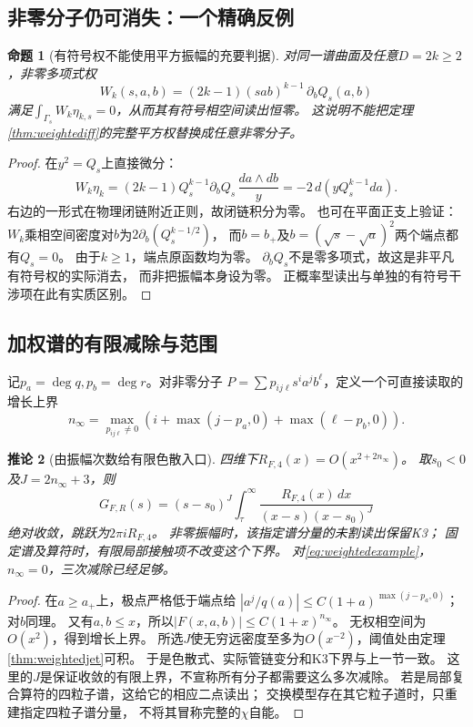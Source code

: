 \documentclass[11pt,a4paper]{ctexart}
\theoremstyle{cnplain}\newtheorem{theorem}{定理}[section]
\newtheorem{proposition}[theorem]{命题}
\newtheorem{corollary}[theorem]{推论}
\theoremstyle{definition}\newtheorem{definition}[theorem]{定义}
\theoremstyle{remark}\newtheorem{remark}[theorem]{注}
\begin{document}
\subsection{非零分子仍可消失：一个精确反例}
\begin{proposition}[有符号权不能使用平方振幅的充要判据]\label{prop:weightedsigned}
对同一谱曲面及任意$D=2k\ge2$，非零多项式权
\begin{equation}\label{eq:weightedsigned}
 W_k(s,a,b)=(2k-1)(sab)^{k-1}\,\partial_bQ_s(a,b)
\end{equation}
满足$\int_{\Gamma_s}W_k\eta_{k,s}=0$，从而其有符号相空间读出恒零。
这说明不能把定理\ref{thm:weightediff}的完整平方权替换成任意非零分子。
\end{proposition}
\begin{proof}
在$y^2=Q_s$上直接微分：
\[
 W_k\eta_k=(2k-1)Q_s^{k-1}\partial_bQ_s\,\frac{da\wedge db}{y}
              =-2\,d\!\left(yQ_s^{k-1}da\right).
\]
右边的一形式在物理闭链附近正则，故闭链积分为零。
也可在平面正支上验证：
$W_k$乘相空间密度对$b$为$2\partial_b(Q_s^{k-1/2})$，
而$b=b_+$及$b=(\sqrt s-\sqrt a)^2$两个端点都有$Q_s=0$。
由于$k\ge1$，端点原函数均为零。
$\partial_bQ_s$不是零多项式，故这是非平凡有符号权的实际消去，
而非把振幅本身设为零。
正概率型读出与单独的有符号干涉项在此有实质区别。
\end{proof}

\subsection{加权谱的有限减除与范围}
记$p_a=\deg q,p_b=\deg r$。对非零分子
$P=\sum p_{ij\ell}s^ia^jb^\ell$，定义一个可直接读取的增长上界
\[
 n_\infty=\max_{p_{ij\ell}\ne0}
       \left(i+\max(j-p_a,0)+\max(\ell-p_b,0)\right).
\]

\begin{corollary}[由振幅次数给有限色散入口]\label{cor:weighteddispersion}
四维下$R_{F,4}(x)=O(x^{2+2n_\infty})$。
取$s_0<0$及$J=2n_\infty+3$，则
\begin{equation}\label{eq:weighteddispersion}
 G_{F,R}(s)=(s-s_0)^J\int_\tau^\infty
       \frac{R_{F,4}(x)\,dx}{(x-s)(x-s_0)^J}
\end{equation}
绝对收敛，跳跃为$2\pi iR_{F,4}$。
非零振幅时，该指定谱分量的未割读出保留K3；
固定谱及算符时，有限局部接触项不改变这个下界。
对\eqref{eq:weightedexample}，$n_\infty=0$，三次减除已经足够。
\end{corollary}
\begin{proof}
在$a\ge a_+$上，极点严格低于端点给
$|a^j/q(a)|\le C(1+a)^{\max(j-p_a,0)}$；对$b$同理。
又有$a,b\le x$，所以$|F(x,a,b)|\le C(1+x)^{n_\infty}$。
无权相空间为$O(x^2)$，得到增长上界。
所选$J$使无穷远密度至多为$O(x^{-2})$，阈值处由定理\ref{thm:weightedjet}可积。
于是色散式、实际管链变分和K3下界与上一节一致。
这里的$J$是保证收敛的有限上界，不宣称所有分子都需要这么多次减除。
若是局部复合算符的四粒子谱，这给它的相应二点读出；
交换模型存在其它粒子道时，只重建指定四粒子谱分量，
不将其冒称完整的$\chi$自能。
\end{proof}
\end{document}
